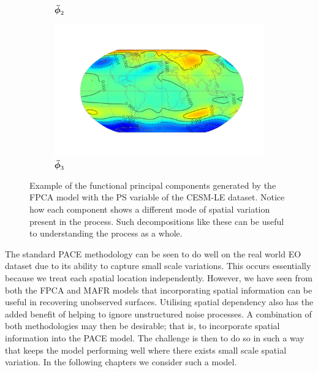 \begin{figure}
\begin{subfigure}[b]{0.45\textwidth}
		\caption{$\bm{{\bar{\phi}}}_{2}$}
		\label{fig:ftsm_res_PS_fpc_2}
	\end{subfigure}
	\begin{subfigure}[b]{0.45\textwidth}
		\includegraphics[width=\textwidth]{ftsm_res_PS_fpc_2}
		\caption{$\bm{{\bar{\phi}}}_{3}$}
		\label{fig:ftsm_res_PS_fpc_3}
	\end{subfigure}
	\caption[Example of the functional principal components generated by the FPCA model with the PS variable.]{Example of the functional principal components generated by the FPCA model with the PS variable of the CESM-LE dataset. Notice how each component shows a different mode of spatial variation present in the process. Such decompositions like these can be useful to understanding the process as a whole.}
	\label{fig:ftsm_res_PS_fpc}
\end{figure}

The standard PACE methodology can be seen to do well on the real world EO dataset due to its ability to capture small scale variations.
This occurs essentially because we treat each spatial location independently.
However, we have seen from both the FPCA and MAFR models that incorporating spatial information can be useful in recovering unobserved surfaces.
Utilising spatial dependency also has the added benefit of helping to ignore unstructured noise processes. 
A combination of both methodologies may then be desirable; that is, to incorporate spatial information into the PACE model.
The challenge is then to do so in such a way that keeps the model performing well where there exists small scale spatial variation.
In the following chapters we consider such a model. 